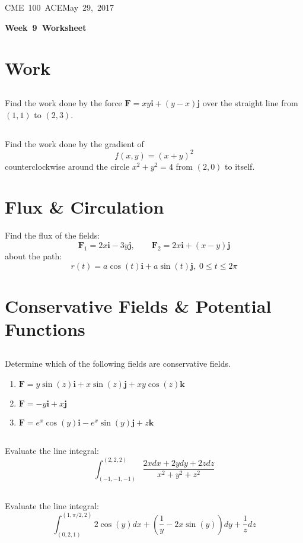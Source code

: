 \documentclass[letterpaper, 11pt]{article}
\makeatletter
\newcommand{\hmwkTitle}{Week\ 9\ Worksheet} %
\newcommand{\hmwkClass}{CME\ 100\ ACE} %
\newcommand{\hmwkAuthorName}{Timothy Anderson} %
\newcommand{\hmwkAuthorEmail}{timmya@stanford.edu} %
\makeatother
\begin{document}
\noindent
\normalsize 
\hmwkClass \hfill May\ 29,\ 2017\\

\begin{center} \Large \textbf{\hmwkTitle} \end{center}

\section{Work}
\subsection{} Find the work done by the force $\bm{F} = xy\bm{i}+(y-x)\bm{j}$ over the straight line from $(1,1)$ to $(2, 3)$.

\subsection{} Find the work done by the gradient of \[f(x, y) = (x + y)^2\] counterclockwise around the circle $x^2 + y^2 = 4$ from $(2, 0)$ to itself.

\section{Flux \& Circulation}
Find the flux of the fields:
\[ \bm{F}_1 = 2x\bm{i} - 3y\bm{j}, \qquad \bm{F}_2 = 2x\bm{i} + (x - y)\bm{j} \]
about the path:
\[r(t) = a\cos(t)\bm{i} + a\sin(t)\bm{j},\; 0 \leq t \leq 2 \pi \]

\section{Conservative Fields \& Potential Functions}
\subsection{} Determine which of the following fields are conservative fields. 
\begin{enumerate}[label=(\alph*)]
\item $\bm{F} = y \sin(z)\bm{i} + x \sin(z)\bm{j} + xy \cos(z)\bm{k} $

\item $\bm{F}=-y\bm{i}+x\bm{j}$

\item $\bm{F} = e^x\cos(y)\bm{i} - e^x\sin(y)\bm{j} + z\bm{k}$

\end{enumerate} 

\subsection{} Evaluate the line integral:
\[ \int_{(-1,-1,-1)}^{(2,2,2)} \frac{2x dx + 2y dy + 2z dz}{x^2 + y^2 + z^2} \]

\subsection{} Evaluate the line integral:
\[ \int_{(0,2,1)}^{(1,\pi/2,2)} 2 \cos(y) dx + \left( \frac{1}{y} - 2x \sin(y) \right) dy  + \frac{1}{z}dz \]
\end{document}
